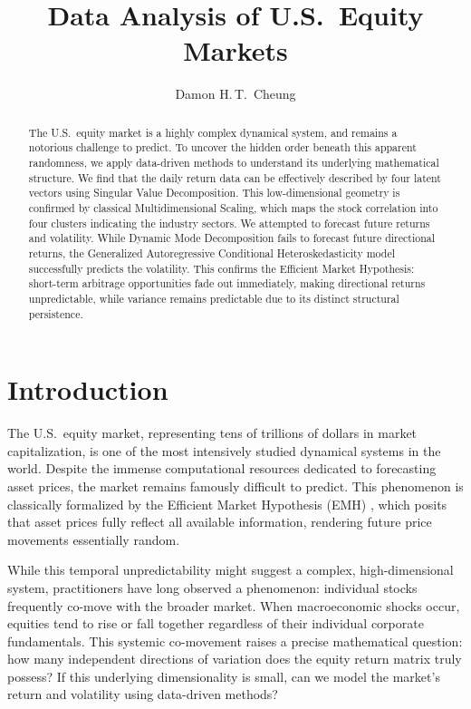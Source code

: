 \documentclass[runningheads]{llncs}
\begin{document}
\title{Data Analysis of U.S.\ Equity Markets}

\author{Damon H.\,T.\ Cheung}

\maketitle

\begin{abstract}
The U.S.\ equity market is a highly complex dynamical system, and remains a notorious challenge to predict. To uncover the hidden order beneath this apparent randomness, we apply data-driven methods to understand its underlying mathematical structure. We find that the daily return data can be effectively described by four latent vectors using Singular Value Decomposition. This low-dimensional geometry is confirmed by classical Multidimensional Scaling, which maps the stock correlation into four clusters indicating the industry sectors. We attempted to forecast future returns and volatility. 
While Dynamic Mode Decomposition fails to forecast future directional returns, the Generalized Autoregressive Conditional Heteroskedasticity model successfully predicts the volatility.
This confirms the Efficient Market Hypothesis: short-term arbitrage opportunities fade out immediately, making directional returns unpredictable, while variance remains predictable due to its distinct structural persistence.
\end{abstract}

\section{Introduction}
\label{sec:intro}

The U.S.\ equity market, representing tens of trillions of dollars in market capitalization, is one of the most intensively studied dynamical systems in the world. Despite the immense computational resources dedicated to forecasting asset prices, the market remains famously difficult to predict. This phenomenon is classically formalized by the Efficient Market Hypothesis (EMH) \citep{fama1970efficient}, which posits that asset prices fully reflect all available information, rendering future price movements essentially random.

While this temporal unpredictability might suggest a complex, high-dimensional system, practitioners have long observed a phenomenon: individual stocks frequently co-move with the broader market. When macroeconomic shocks occur, equities tend to rise or fall together regardless of their individual corporate fundamentals. This systemic co-movement raises a precise mathematical question: how many independent directions of variation does the equity return matrix truly possess?
If this underlying dimensionality is small, can we model the market's return and volatility using data-driven methods?
\end{document}
